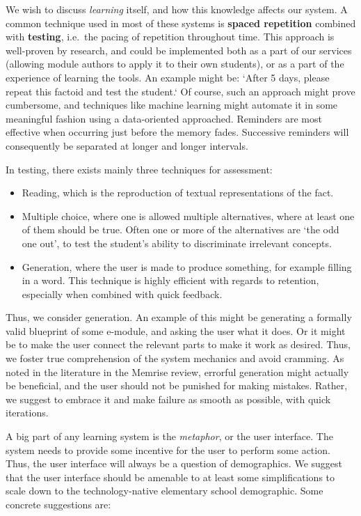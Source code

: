 We wish to discuss \textit{learning} itself, and how this knowledge affects 
our system. A common technique used in most of these systems is \textbf{spaced 
repetition} combined with \textbf{testing}, i.e.\ the pacing of repetition 
throughout time. This approach is well-proven by research, and could be 
implemented both as a part of our services (allowing module authors to apply 
it to their own students), or as a part of the experience of learning the 
tools. An example might be: `After 5 days, please repeat this factoid and test 
the student.` Of course, such an approach might prove cumbersome, and 
techniques like machine learning might automate it in some meaningful fashion 
using a data-oriented approached. Reminders are most effective when occurring 
just before the memory fades. Successive reminders will consequently be 
separated at longer and longer intervals\cite{memrise}.

In testing, there exists mainly three techniques for assessment:

\begin{itemize}
\item Reading, which is the reproduction of textual representations of the fact.
\item Multiple choice, where one is allowed multiple alternatives, where at
least one of them should be true. Often one or more of the alternatives are `the
odd one out', to test the student's ability to discriminate irrelevant 
concepts.
\item Generation, where the user is made to produce something, for example
filling in a word. This technique is highly efficient with regards to 
retention, especially when combined with quick 
feedback\cite{potts2014benefit}.
\end{itemize}

Thus, we consider generation. An example of this might be generating a formally
valid blueprint of some e-module, and asking the user what it does. Or it might
be to make the user connect the relevant parts to make it work as desired. Thus,
we foster true comprehension of the system mechanics and avoid cramming. As
noted in the literature in the Memrise review, errorful generation might 
actually be beneficial, and the user should not be punished for making 
mistakes. Rather, we suggest to embrace it and make failure as smooth as 
possible, with quick iterations.

A big part of any learning system is the \textit{metaphor}, or the user
interface. The system needs to provide some incentive for the user to perform
some action. Thus, the user interface will always be a question of demographics.
We suggest that the user interface should be amenable to at least some
simplifications to scale down to the technology-native elementary school
demographic. Some concrete suggestions are:

